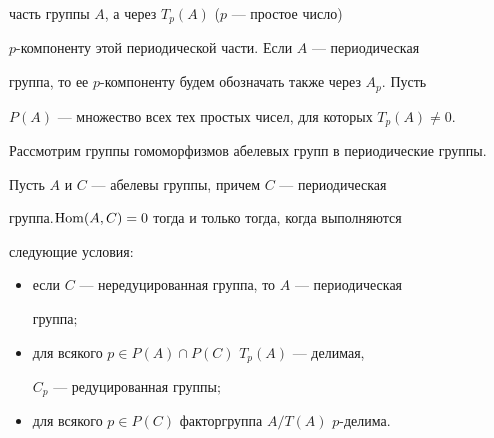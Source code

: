 часть группы $A$, а через $T_p(A)$ ($p$ --- простое число) 


$p$-компоненту этой периодической части. Если $A$ --- периодическая 


группа, то ее $p$-компоненту будем обозначать также через $A_p$. Пусть 


$P(A)$ --- множество всех тех простых чисел, для которых $T_p(A)\ne0$. 


Рассмотрим группы гомоморфизмов абелевых групп в периодические группы. 


 


\begin{thm} 


Пусть $A$ и $C$ --- абелевы группы, причем $C$ --- периодическая 


группа.\linebreak $\operatorname{Hom}(A,C)=0$ тогда и только тогда, когда выполняются 


следующие условия$:$


\begin{itemize} 


\item[1)] если $C$ --- нередуцированная группа, то $A$ --- периодическая 


группа$;$ 


\item[2)] для всякого $p\in P(A)\cap P(C)$\; $T_p(A)$ --- делимая, 


$C_p$ --- редуцированная группы$;$ 


\item[3)] для всякого $p\in P(C)$ факторгруппа $A/T(A)$\; $p$-делима. 


\end{itemize} 


\end{thm} 


 


